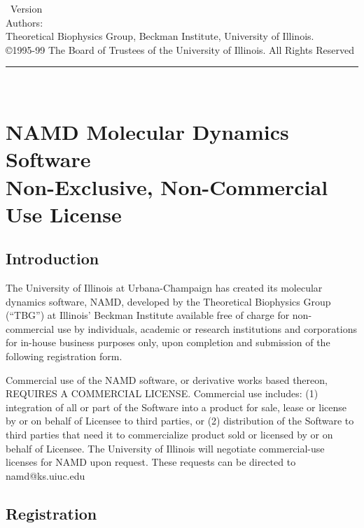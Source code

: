 
\thispagestyle{empty}

\vspace*{0.1in}

\begin{centering}
{\LARGE \NAMD\ Version \NAMDVER}\\
\bigskip
{\large Authors: \NAMDAUTHORS} \\
\medskip
{\large Theoretical Biophysics Group, Beckman Institute, University of Illinois.} \\
\bigskip
{\large \copyright 1995-99 The Board of Trustees of the University of Illinois.
All Rights Reserved} \\
\bigskip
\end{centering}

  \rule{6in}{0.04in}				\\	\vspace{0.25in}

\section*{NAMD Molecular Dynamics Software \\
Non-Exclusive, Non-Commercial Use License}

\subsection*{Introduction}

The University of Illinois at Urbana-Champaign has created its molecular
dynamics software, NAMD, developed by the Theoretical Biophysics 
Group (``TBG'') at Illinois' Beckman Institute available free of charge for
non-commercial use by individuals, academic or research institutions and
corporations for in-house business purposes only, upon completion and
submission of the following registration form.

Commercial use of the NAMD software, or derivative works based thereon,
REQUIRES A COMMERCIAL LICENSE. Commercial use includes: 
(1) integration of all or part of the Software into a product for sale, 
lease or license by or on behalf of Licensee to third parties, or 
(2) distribution of the Software to third parties that need it to 
commercialize product sold or licensed by or on behalf of Licensee.  
The University of Illinois will negotiate commercial-use licenses for 
NAMD upon request. These requests can be directed to namd@ks.uiuc.edu

\subsection*{Registration}

